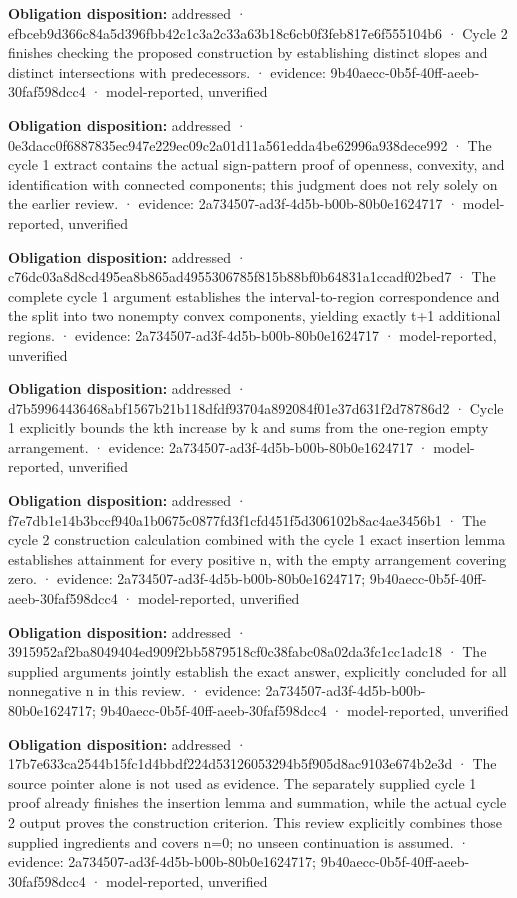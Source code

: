 \documentclass[11pt]{article}
\begin{document}
\textbf{Obligation disposition:} addressed · efbceb9d366c84a5d396fbb42c1c3a2c33a63b18c6cb0f3feb817e6f555104b6 · Cycle 2 finishes checking the proposed construction by establishing distinct slopes and distinct intersections with predecessors. · evidence: 9b40aecc-0b5f-40ff-aeeb-30faf598dcc4 · model-reported, unverified\par
\textbf{Obligation disposition:} addressed · 0e3dacc0f6887835ec947e229ec09c2a01d11a561edda4be62996a938dece992 · The cycle 1 extract contains the actual sign-pattern proof of openness, convexity, and identification with connected components; this judgment does not rely solely on the earlier review. · evidence: 2a734507-ad3f-4d5b-b00b-80b0e1624717 · model-reported, unverified\par
\textbf{Obligation disposition:} addressed · c76dc03a8d8cd495ea8b865ad4955306785f815b88bf0b64831a1ccadf02bed7 · The complete cycle 1 argument establishes the interval-to-region correspondence and the split into two nonempty convex components, yielding exactly t+1 additional regions. · evidence: 2a734507-ad3f-4d5b-b00b-80b0e1624717 · model-reported, unverified\par
\textbf{Obligation disposition:} addressed · d7b59964436468abf1567b21b118dfdf93704a892084f01e37d631f2d78786d2 · Cycle 1 explicitly bounds the kth increase by k and sums from the one-region empty arrangement. · evidence: 2a734507-ad3f-4d5b-b00b-80b0e1624717 · model-reported, unverified\par
\textbf{Obligation disposition:} addressed · f7e7db1e14b3bccf940a1b0675c0877fd3f1cfd451f5d306102b8ac4ae3456b1 · The cycle 2 construction calculation combined with the cycle 1 exact insertion lemma establishes attainment for every positive n, with the empty arrangement covering zero. · evidence: 2a734507-ad3f-4d5b-b00b-80b0e1624717; 9b40aecc-0b5f-40ff-aeeb-30faf598dcc4 · model-reported, unverified\par
\textbf{Obligation disposition:} addressed · 3915952af2ba8049404ed909f2bb5879518cf0c38fabc08a02da3fc1cc1adc18 · The supplied arguments jointly establish the exact answer, explicitly concluded for all nonnegative n in this review. · evidence: 2a734507-ad3f-4d5b-b00b-80b0e1624717; 9b40aecc-0b5f-40ff-aeeb-30faf598dcc4 · model-reported, unverified\par
\textbf{Obligation disposition:} addressed · 17b7e633ca2544b15fc1d4bbdf224d53126053294b5f905d8ac9103e674b2e3d · The source pointer alone is not used as evidence. The separately supplied cycle 1 proof already finishes the insertion lemma and summation, while the actual cycle 2 output proves the construction criterion. This review explicitly combines those supplied ingredients and covers n=0; no unseen continuation is assumed. · evidence: 2a734507-ad3f-4d5b-b00b-80b0e1624717; 9b40aecc-0b5f-40ff-aeeb-30faf598dcc4 · model-reported, unverified\par
\end{document}
